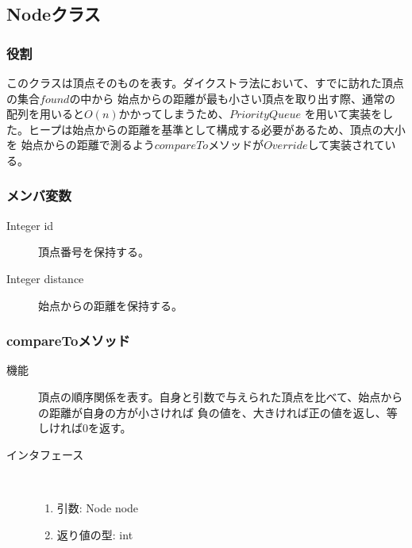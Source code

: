 \documentclass[a4j]{jarticle}
\begin{document}
\subsection{Nodeクラス}

\subsubsection{役割}
このクラスは頂点そのものを表す。ダイクストラ法において、すでに訪れた頂点の集合\(found\)の中から
始点からの距離が最も小さい頂点を取り出す際、通常の配列を用いると\(O(n)\)かかってしまうため、\(PriorityQueue\)
を用いて実装をした。ヒープは始点からの距離を基準として構成する必要があるため、頂点の大小を
始点からの距離で測るよう\(compareTo\)メソッドが\(Override\)して実装されている。

\subsubsection{メンバ変数}

\begin{description}
\item[Integer id]
頂点番号を保持する。

\item[Integer distance]
始点からの距離を保持する。

\end{description}

\subsubsection{compareToメソッド}

\begin{description}
\item[機能]
頂点の順序関係を表す。自身と引数で与えられた頂点を比べて、始点からの距離が自身の方が小さければ
負の値を、大きければ正の値を返し、等しければ0を返す。

\item[インタフェース]\ \vspace{0mm}
\begin{enumerate}
  \item 引数: Node node
  \item 返り値の型: int
\end{enumerate}
\end{description}
\end{document}
